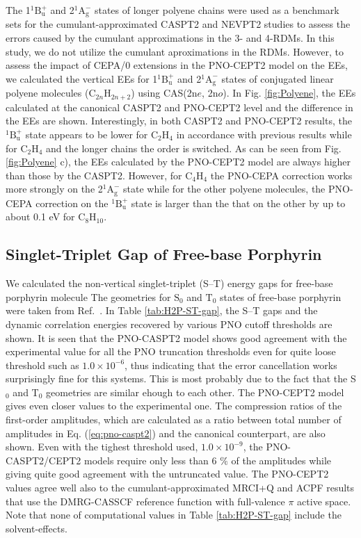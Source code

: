 \documentclass[aip,jcp,amsmath,twocolumn,floatfix,reprint,fleqn]{revtex4-1}
\begin{document}
%
The 1${}^1\text{B}_\text{u}^{+}$ and 2${}^1\text{A}_\text{g}^{-}$ states of longer polyene chains were used as a benchmark sets for the cumulant-approximated CASPT2\cite{doi:10.1063/1.4900878} and NEVPT2\cite{Zgid2009} studies to assess the errors caused by the cumulant approximations in the 3- and 4-RDMs.
%
In this study, we do not utilize the cumulant aproximations in the RDMs.
%
However, to assess the impact of CEPA/0 extensions in the PNO-CEPT2 model on the EEs, we calculated the vertical EEs for 1${}^1\text{B}_\text{u}^{+}$ and 2${}^1\text{A}_\text{g}^{-}$ states of conjugated linear polyene molecules (C${}_{2n}$H${}_{2n+2}$) using CAS(2n$e$, 2n$o$).
%
In Fig. \ref{fig:Polyene}, the EEs calculated at the canonical CASPT2 and PNO-CEPT2 level and the difference in the EEs are shown.
%
Interestingly, in both CASPT2 and PNO-CEPT2 results, the ${}^1\text{B}_\text{u}^{+}$ state appears to be lower for C${}_2$H${}_4$ in accordance with previous results\cite{doi:10.1063/1.4900878} while for C${}_2$H${}_4$ and the longer chains the order is switched.
%
As can be seen from Fig. \ref{fig:Polyene} c), the EEs calculated by the PNO-CEPT2 model are always higher than those by the CASPT2.
%
However, for C${}_4$H${}_4$ the PNO-CEPA correction works more strongly on the 2${}^1\text{A}_\text{g}^{-}$ state while for the other polyene molecules, the PNO-CEPA correction on the ${}^1\text{B}_\text{u}^{+}$ state is larger than the that on the other by up to about 0.1 eV for C${}_8$H${}_{10}$.

\subsection{Singlet-Triplet Gap of Free-base Porphyrin}
%
We calculated the non-vertical singlet-triplet (S--T) energy gaps for free-base porphyrin molecule
%
The geometries for $\text{S}_0$ and $\text{T}_0$ states of free-base porphyrin were taken from Ref.~.
%
In Table \ref{tab:H2P-ST-gap}, the S--T gaps and the dynamic correlation energies recovered by various PNO cutoff thresholds are shown.
%
It is seen that the PNO-CASPT2 model shows good agreement with the experimental value for all the PNO truncation thresholds even for quite loose threshold such as $1.0\times 10^{-6}$, thus indicating that the error cancellation works surprisingly fine for this systems.
%
This is most probably due to the fact that the S${}_0$ and T${}_0$ geometries are similar ehough to each other.
%
The PNO-CEPT2 model gives even closer values to the experimental one.
%
The compression ratios of the first-order amplitudes, which are calculated as a ratio between total number of amplitudes in Eq. (\ref{eq:pno-caspt2}) and the canonical counterpart, are also shown.
%
Even with the tighest threshold used, $1.0\times 10^{-9}$, the PNO-CASPT2/CEPT2 models require only less than 6 $\%$ of the amplitudes while giving quite good agreement with the untruncated value.
%
The PNO-CEPT2 values agree well also to the cumulant-approximated MRCI+Q and ACPF results that use the DMRG-CASSCF reference function with full-valence $\pi$ active space.
%
Note that none of computational values in Table \ref{tab:H2P-ST-gap} include the solvent-effects.
\end{document}
